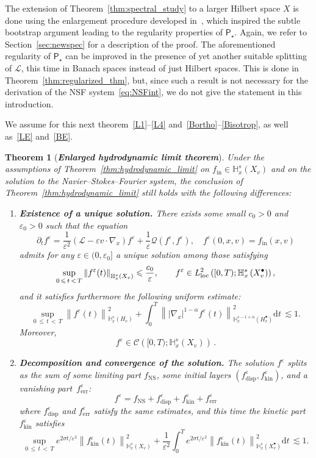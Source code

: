 \documentclass[10pt]{amsart}
\newtheorem{theo}{Theorem}[section]
\theoremstyle{definition}\newtheorem{defi}[theo]{Definition}\newtheorem{rema}[theo]{Remark}\newtheorem{exam}[theo]{Example}\newtheorem{exem}[theo]{Example}\newtheorem{nota}[theo]{Notation}
\newcommand{\ini}{\mathrm{in}}
\newcommand{\err}{\mathrm{err}}
\newcommand{\ns}{\mathrm{NS}}
\newcommand{\kin}{\mathrm{kin}}
\renewcommand{\d}{\mathrm{d}}
\newcommand{\disp}{\mathrm{disp}}
\newcommand{\bbH}{\mathbb{H}}
\newcommand{\CC}{\mathcal{C}}
\newcommand{\LL}{\mathcal{L}}
\newcommand{\PP}{\mathsf{P}}
\newcommand{\QQ}{\mathcal{Q}}
\newcommand{\Ss}{H}
\newcommand{\Ssp}{H^{\bullet}}
\newcommand{\Sl}{X}
\newcommand{\Slp}{X^{\bullet}}
\renewcommand*\le{\leqslant}
\newcommand*\eps{{\varepsilon}}
\newcommand*{\relabel}{\renewcommand{\labelenumi}{(\theenumi)}}
\newcommand*{\bfenumi}{\renewcommand*{\theenumi}{\textit{\textbf{\arabic{enumi}}}}\relabel}
\begin{document}
The extension of Theorem~\ref{thm:spectral_study} to a larger Hilbert space $\Sl$ is done using the enlargement procedure developed in~\cite{GMM2017}, which inspired the subtle bootstrap argument leading to the regularity properties of $\PP_\star$. Again, we refer to Section~\ref{sec:newspec} for a description of the proof. {The aforementioned regularity of $\PP_\star$ can be improved in the presence of yet another suitable splitting of $\LL$, this time in Banach spaces instead of just Hilbert spaces}. This is done in Theorem~\ref{thm:regularized_thm}, but, since such a result is not necessary for the derivation of the NSF system~\eqref{eq:NSFint}, we do not give the statement in this introduction.

We assume for this next theorem~\eqref{L1}--\eqref{L4} and~\eqref{Bortho}--\eqref{Bisotrop}, as well as~\eqref{LE} and~\eqref{BE}.

\begin{theo}[\emph{\textbf{Enlarged hydrodynamic limit theorem}}]\label{thm:hydrodynamic_limit-gen_symmetric}
Under the assumptions of Theorem~\ref{thm:hydrodynamic_limit} {on $f_\ini \in \bbH^s_x \left(\Sl_v \right)$} and on the solution to the Navier--Stokes--Fourier system, {the conclusion of Theorem~\ref{thm:hydrodynamic_limit} still holds with the following differences:}
\begin{enumerate}\bfenumi
\item\label{theo1.20.1} \textit{\textbf{Existence of a unique solution.}} There exists some small $c_0 > 0$ and $\eps_0 > 0$ such that the equation
\[
\partial_t f^\eps = \frac{1}{\eps^2} \left(\LL - \eps v \cdot \nabla_x \right) f^\eps + \frac{1}{\eps} \QQ\left(f^\eps, f^\eps \right), \quad f^\eps(0, x, v) = f_\ini(x, v)
\]
admits for any $\eps \in (0, \eps_0]$ a unique solution among those satisfying
\[
\sup_{0\, \le\,t\,<\,T} \left\| f^\eps(t) \right\|_{ \bbH^s_x \left(\Sl_v \right) } \le \frac{c_0}{\eps}, \qquad f^\eps \in L^2_{\rm{loc}} \left([0, T) ; \bbH^s_x \left(\Slp_v\right) \right),
\]
and it satisfies furthermore the following uniform estimate:
\[
\sup_{0\,\le\,t\,<\,T} \left\| f^\eps(t) \right\|_{ \bbH^s_x \left(\Ss_v \right) }^2 + \int_0^T\left\| | \nabla_x |^{1-\alpha } f^\eps(t)\right\|_{ \bbH^{s-1+\alpha}_x \left(\Ssp_v \right) }^2 \d t \, \lesssim 1.
\]
Moreover,
\[
f^\eps \in\CC\left([0, T) ; \bbH^s_x \left(\Sl_v \right) \right)\,.
\]
\item\label{theo1.20.2} \textit{\textbf{Decomposition and convergence of the solution.}} The solution $f^\eps$ splits as the sum of some limiting part $f_\ns$, some initial layers $(f^\eps_\disp, f^\eps_\kin)$, and a vanishing part~$f^\eps_\err$:
\[
f^\eps = f_\ns + f^\eps_\disp + f^\eps_\kin + f^\eps_\err
\]
where $f^\eps_\disp$ and $f^\eps_\err$ satisfy the same estimates, and this time the kinetic part $f^\eps_\kin$ satisfies
\[
\sup_{0\,\le\,t\,<\,T} e^{2 \sigma t / \eps^2} \left\| f^\eps_\kin(t) \right\|_{ \bbH^s_x \left(\Sl_v \right) }^2 + \frac{1}{\eps^2} \int_0^T e^{2 \sigma t / \eps^2} \left\| f^\eps_\kin(t) \right\|_{ \bbH^s_x \left(\Slp_v \right) }^2 \d t \, {\lesssim 1}.
\]
\end{enumerate}
\end{theo}
\end{document}
